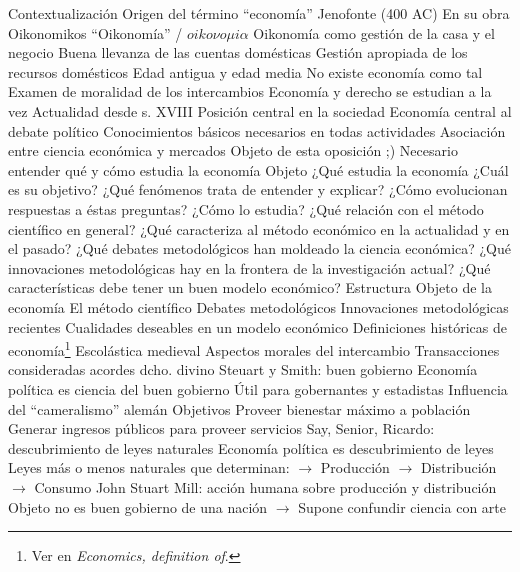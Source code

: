 \documentclass{nuevotema}
\begin{document}
\begin{esquemal}
	\1[] 
		\2 Contextualización
			\3 Origen del término ``economía''
				\4 Jenofonte (400 AC)
				\4[] En su obra Oikonomikos
				\4[] ``Oikonomía'' / $oiko\nu o \mu i \alpha$
				\4 Oikonomía como gestión de la casa y el negocio
				\4[] Buena llevanza de las cuentas domésticas
				\4[] Gestión apropiada de los recursos domésticos
			\3 Edad antigua y edad media
				\4 No existe economía como tal
				\4 Examen de moralidad de los intercambios
				\4 Economía y derecho se estudian a la vez
			\3 Actualidad desde s. XVIII
				\4 Posición central en la sociedad
				\4[] Economía central al debate político
				\4[] Conocimientos básicos necesarios en todas actividades
				\4[] Asociación entre ciencia económica y mercados
				\4[] Objeto de esta oposición ;)
				\4[$\Rightarrow$] Necesario entender qué y cómo estudia la economía
		\2 Objeto
			\3 ¿Qué estudia la economía
				\4 ¿Cuál es su objetivo?
				\4 ¿Qué fenómenos trata de entender y explicar?
				\4 ¿Cómo evolucionan respuestas a éstas preguntas?
			\3 ¿Cómo lo estudia?
				\4 ¿Qué relación con el método científico en general?
				\4 ¿Qué caracteriza al método económico en la actualidad y en el pasado?
				\4 ¿Qué debates metodológicos han moldeado la ciencia económica?
				\4 ¿Qué innovaciones metodológicas hay en la frontera de la investigación actual?
				\4 ¿Qué características debe tener un buen modelo económico?
		\2 Estructura
			\3 Objeto de la economía
			\3 El método científico
			\3 Debates metodológicos
			\3 Innovaciones metodológicas recientes
			\3 Cualidades deseables en un modelo económico
	\1 
		\2 Definiciones históricas de economía\footnote{Ver en \textit{Economics, definition of}.}
			\3 Escolástica medieval
				\4 Aspectos morales del intercambio
				\4 Transacciones consideradas acordes dcho. divino
			\3 Steuart y Smith: buen gobierno
				\4 Economía política es ciencia del buen gobierno
				\4[] Útil para gobernantes y estadistas
				\4[] Influencia del ``cameralismo'' alemán
				\4 Objetivos
				\4[] Proveer bienestar máximo a población
				\4[] Generar ingresos públicos para proveer servicios
			\3 Say, Senior, Ricardo: descubrimiento de leyes naturales
				\4 Economía política es descubrimiento de leyes
				\4 Leyes más o menos naturales que determinan:
				\4[] $\to$ Producción
				\4[] $\to$ Distribución
				\4[] $\to$ Consumo
			\3 John Stuart Mill: acción humana sobre producción y distribución
				\4 Objeto no es buen gobierno de una nación
				\4[] $\to$ Supone confundir ciencia con arte

\end{esquemal}
\end{document}
